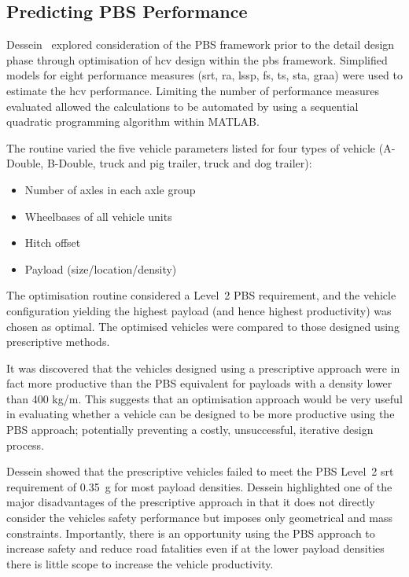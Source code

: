 \subsection{Predicting PBS Performance}\label{section:optimisation-of-vehicles-within-the-pbs-framework}

Dessein~\cite{Dessein2012} explored consideration of the PBS framework prior to the detail design phase through optimisation of \gls{hcv} design within the \gls{pbs} framework. Simplified models for eight performance measures (\gls{srt}, \gls{ra}, \gls{lssp}, \gls{fs}, \gls{ts}, \gls{sta}, \gls{graa}) were used to estimate the \gls{hcv} performance. Limiting the number of performance measures evaluated allowed the calculations to be automated by using a sequential quadratic programming algorithm within MATLAB.

The routine varied the five vehicle parameters listed for four types of vehicle (A-Double, B-Double, truck and pig trailer, truck and dog trailer):

\begin{itemize}
    \item Number of axles in each axle group
    \item Wheelbases of all vehicle units
    \item Hitch offset
    \item Payload (size/location/density)
\end{itemize}

The optimisation routine considered a Level~2 PBS requirement, and the vehicle configuration yielding the highest payload (and hence highest productivity) was chosen as optimal. The optimised vehicles were compared to those designed using prescriptive methods.

It was discovered that the vehicles designed using a prescriptive approach were in fact more productive than the PBS equivalent for payloads with a density lower than 400 kg/m\ssth{}. This suggests that an optimisation approach would be very useful in evaluating whether a vehicle can be designed to be more productive using the PBS approach; potentially preventing a costly, unsuccessful, iterative design process.

Dessein showed that the prescriptive vehicles failed to meet the PBS Level~2 \gls{srt} requirement of 0.35~g for most payload densities. Dessein highlighted one of the major disadvantages of the prescriptive approach in that it does not directly consider the vehicles safety performance but imposes only geometrical and mass constraints. Importantly, there is an opportunity using the PBS approach to increase safety and reduce road fatalities even if at the lower payload densities there is little scope to increase the vehicle productivity.

